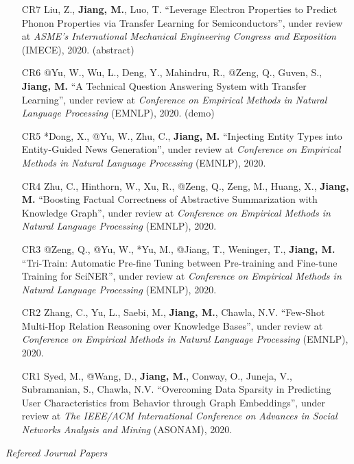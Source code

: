 \documentclass[10pt]{article}
\newenvironment{myindentpar}[1]%
{\begin{list}{}%
         {\setlength{\leftmargin}{#1}}%
         \item[]%
}
{\end{list}}
\newcounter{list}
\begin{document}
\begin{myindentpar}{0.00cm}
\begin{enumerate}[leftmargin=.5cm]
\item[CR7] Liu, Z., \textbf{Jiang, M.}, Luo, T. ``Leverage Electron Properties to Predict Phonon Properties via Transfer Learning for Semiconductors'', under review at \textit{ASME's International Mechanical Engineering Congress and Exposition} (IMECE), 2020. (abstract)

\item[CR6] @Yu, W., Wu, L., Deng, Y., Mahindru, R., @Zeng, Q., Guven, S., \textbf{Jiang, M.} ``A Technical Question Answering System with Transfer Learning'', under review at \textit{Conference on Empirical Methods in Natural Language Processing} (EMNLP), 2020. (demo)	

\item[CR5] *Dong, X., @Yu, W., Zhu, C., \textbf{Jiang, M.} ``Injecting Entity Types into Entity-Guided News Generation'', under review at \textit{Conference on Empirical Methods in Natural Language Processing} (EMNLP), 2020.

\item[CR4] Zhu, C., Hinthorn, W., Xu, R., @Zeng, Q., Zeng, M., Huang, X., \textbf{Jiang, M.} ``Boosting Factual Correctness of Abstractive Summarization with Knowledge Graph'', under review at \textit{Conference on Empirical Methods in Natural Language Processing} (EMNLP), 2020.

\item[CR3] @Zeng, Q., @Yu, W., *Yu, M., @Jiang, T., Weninger, T., \textbf{Jiang, M.} ``Tri-Train: Automatic Pre-fine Tuning between Pre-training and Fine-tune Training for SciNER'', under review at \textit{Conference on Empirical Methods in Natural Language Processing} (EMNLP), 2020.

\item[CR2] Zhang, C., Yu, L., Saebi, M., \textbf{Jiang, M.}, Chawla, N.V. ``Few-Shot Multi-Hop Relation Reasoning over Knowledge Bases'', under review at \textit{Conference on Empirical Methods in Natural Language Processing} (EMNLP), 2020.

\item[CR1] Syed, M., @Wang, D., \textbf{Jiang, M.}, Conway, O., Juneja, V., Subramanian, S., Chawla, N.V. ``Overcoming Data Sparsity in Predicting User Characteristics from Behavior through Graph Embeddings'', under review at \textit{The IEEE/ACM International Conference on Advances in Social Networks Analysis and Mining} (ASONAM), 2020.

\end{enumerate}

\vspace{.2cm}\hspace{-0.25cm}\textit{Refereed Journal Papers}


\end{myindentpar}
\end{document}
